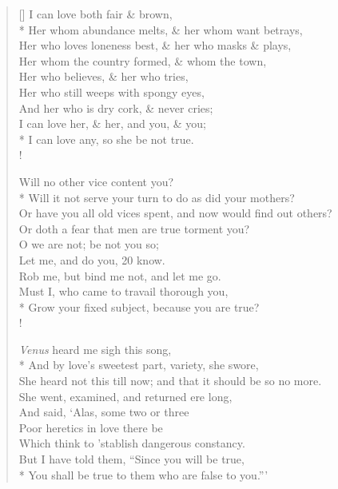 \documentclass[MAIN]{subfiles}
\begin{document}
\settowidth{\versewidth}{Her who loves loneness best, \& her who masks \& plays,}
\begin{verse}[\versewidth]
\vin \vin I can love both fair \& brown,\\*
Her whom abundance melts, \& her whom want betrays,\\
Her who loves loneness best, \& her who masks \& plays,\\
\vin Her whom the country formed, \& whom the town,\\
\vin \vin Her who believes, \& her who tries,\\
\vin \vin Her who still weeps with spongy eyes,\\
\vin And her who is dry cork, \& never cries;\\
\vin I can love her, \& her, and you, \& you;\\*
\vin I can love any, so she be not true.\\!

\vin \vin Will no other vice content you?\\*
Will it not serve your turn to do as did your mothers?\\
Or have you all old vices spent, and now would find out others?\\
\vin Or doth a fear that men are true torment you?\\
\vin \vin O we are not; be not you so;\\
\vin \vin Let me, and do you, 20 know.\\
\vin Rob me, but bind me not, and let me go.\\
\vin Must I, who came to travail thorough you,\\*
\vin Grow your fixed subject, because you are true?\\!

\vin \vin \emph{Venus} heard me sigh this song,\\*
And by love's sweetest part, variety, she swore,\\
She heard not this till now; and that it should be so no more.\\
\vin She went, examined, and returned ere long,\\
\vin \vin And said, `Alas, some two or three\\
\vin \vin Poor heretics in love there be\\
\vin Which think to 'stablish dangerous constancy.\\
\vin But I have told them, ``Since you will be true,\\*
\vin You shall be true to them who are false to you.{''}'
\end{verse}
\end{document}
